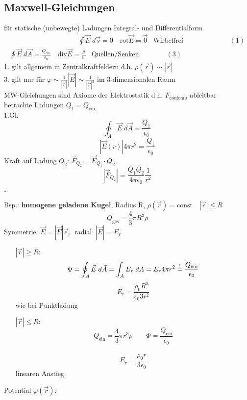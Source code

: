 \documentclass[titlepage,12pt,a4paper,ngerman]{report}
\newcommand{\tx}[1]{\textrm{#1}}
\begin{document}
\subsection{Maxwell-Gleichungen}
für statische (unbewegte) Ladungen
Integral- und Differentialform \\
\begin{eqnarray*}
\phantom{\qquad \qquad \qquad \qquad \qquad}\boxed{\oint \vec{E}\; d\vec{s} = 0 \quad \tx{rot}\vec{E} = \vec{0}\ \ \textrm{ Wirbelfrei }} \qquad \quad \qquad \quad \ \ (1)\\
\boxed{\oint \vec{E} \; d\vec{A} = \frac{Q_{\tx{ein}}}{\epsilon_0} \quad \tx{div}\vec{E}= \frac{\rho}{\epsilon_0}  \ \ \textrm{ Quellen/Senken}}  \qquad \qquad (3)
\end{eqnarray*}
1. gilt allgemein in Zentralkraftfeldern d.h. $\rho(\vec{r}) \sim |\vec{r}|$\\
3. gilt nur für $\varphi \sim \frac{1}{|\vec{r}|} | \vec{E} | \sim \frac{1}{|\vec{r}|^2}$ im 3-dimensionalen Raum\\[10pt]
MW-Gleichungen sind Axiome der Elektrostatik d.h. $F_{\tx{coulomb}}$ ableitbar\\
betrachte Ladungen $Q_1 = Q_{\tx{ein}}$\\
1.Gl: $$\oint_A \vec{E}\; d\vec{A} = \frac{Q_1}{\epsilon_0}$$
$$|\vec{E}(r)| 4 \pi r^2 = \frac{Q_1}{\epsilon_0}$$
Kraft auf Ladung $Q_2$: $\vec{F}_{Q_2} = \vec{E}_{Q_1} \cdot Q_2$
$$|\vec{F}_{Q_2}| = \frac{Q_1 Q_2}{4\pi\epsilon_0} \frac{1}{r^2}$$ 
\begin{flushright}
$\square$
\end{flushright}
Bsp.: \textbf{homogene geladene Kugel}, Radius R, $\rho(\vec{r}) = \textrm{const}\quad |\vec{r}| \le R$
$$ Q_{\tx{ges}} = \frac{4}{3} \pi R^3 \rho$$
Symmetrie:  $ \vec{E} = |\vec{E}| \vec{e}_r\ $ radial $\  |\vec{E}| = E_r$\\
\begin{itemize}
\item[$|\vec{r}|\ge R$:] $$\Phi = \oint_A \vec{E} \; d \vec{A} = \int_A E_r \; dA = E_r 4 \pi r^2 \buildrel ! \over = \frac{Q_{\tx{ein}}}{\epsilon_0}$$
$$ E_r = \frac{\rho_0 R^3}{\epsilon_0 3 r^2}$$
wie bei Punktladung
\item[$|\vec{r}|\le R$:] $$ Q_{\tx{ein}} = \frac{4}{3} \pi r^3 \rho \qquad \Phi = \frac{Q_{\tx{ein}}}{\epsilon_0}$$\\
$$ E_r = \frac{\rho_0 r}{3 \epsilon_0}$$ linearen Anstieg
\end{itemize}
\noindent
Potential $\varphi(\vec{r})$:\\
\end{document}
